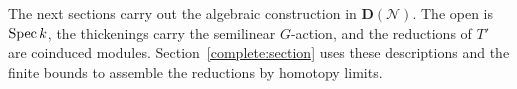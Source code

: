 The next sections carry out the algebraic construction in
$\mathbf D(\mathcal N)$.  The open is $\operatorname{Spec} k$, the thickenings carry
the semilinear $G$-action, and the reductions of $T'$ are coinduced
modules.  Section~\ref{complete:section} uses these descriptions and
the finite bounds to assemble the reductions by homotopy limits.
